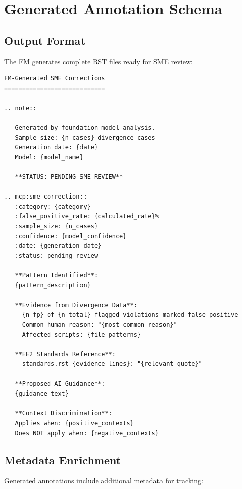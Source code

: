 \documentclass[11pt,a4paper]{article}
\begin{document}
\section{Generated Annotation Schema}

\subsection{Output Format}

The FM generates complete RST files ready for SME review:

\begin{lstlisting}[style=rst, caption={FM-Generated Annotation Template}]
FM-Generated SME Corrections
============================

.. note::
   
   Generated by foundation model analysis.
   Sample size: {n_cases} divergence cases
   Generation date: {date}
   Model: {model_name}
   
   **STATUS: PENDING SME REVIEW**

.. mcp:sme_correction::
   :category: {category}
   :false_positive_rate: {calculated_rate}%
   :sample_size: {n_cases}
   :confidence: {model_confidence}
   :date: {generation_date}
   :status: pending_review
   
   **Pattern Identified**:
   {pattern_description}
   
   **Evidence from Divergence Data**:
   - {n_fp} of {n_total} flagged violations marked false positive
   - Common human reason: "{most_common_reason}"
   - Affected scripts: {file_patterns}
   
   **EE2 Standards Reference**:
   - standards.rst {evidence_lines}: "{relevant_quote}"
   
   **Proposed AI Guidance**:
   {guidance_text}
   
   **Context Discrimination**:
   Applies when: {positive_contexts}
   Does NOT apply when: {negative_contexts}
\end{lstlisting}

\subsection{Metadata Enrichment}

Generated annotations include additional metadata for tracking:
\end{document}

